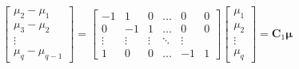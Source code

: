 \documentclass[8pt]{beamer}
\begin{document}
\begin{frame}
            \begin{displaymath}
                \begin{bmatrix}
                        \mu_{2} - \mu_{1}\\
                        \mu_{3} - \mu_{2} \\
                        \vdots \\
                        \mu_{q} - \mu_{q-1}
                \end{bmatrix}
                =
                \begin{bmatrix}
                        -1 & 1 & 0 & \hdots & 0 & 0\\
                        0 & -1 & 1 & \hdots & 0 & 0\\
                        \vdots & \vdots & \vdots & \ddots & \vdots\\
                        1 & 0 & 0 & \hdots & -1 & 1
                \end{bmatrix}
                \begin{bmatrix}
                        \mu_{1} \\
                        \mu_{2} \\
                        \vdots \\
                        \mu_{q}
                \end{bmatrix}
                = \mathbf{C}_{1}\mathbf{\mu}
            \end{displaymath}
            
        \end{frame}
        
        
\end{document}
